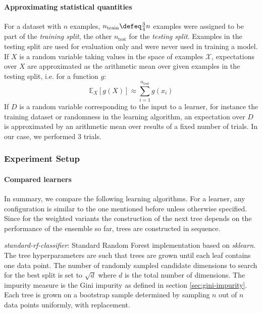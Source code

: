 \documentclass[
    a4paper, %
	fontsize=10pt, %
	twoside=false, %
]{kaobook}
\begin{document}
\paragraph{Approximating statistical quantities} 
For a dataset with $n$ examples, $n_{\text{train}} \defeq \frac{3}{4}n$ examples were assigned to be part of the \textit{training split}, the other $n_{\text{test}}$ for the \textit{testing split}. Examples in the testing split are used for evaluation only and were never used in training a model.
If $X$ is a random variable taking values in the space of examples $\mathcal{X}$, expectations over $X$ are approximated as the arithmetic mean over given examples in the testing split, i.e. for a function $g$:
$$
\mathbb{E}_X \left[ g(X) \right]  \approx \sum_{i=1}^{n_\text{test}} g(x_i)
$$
If $D$ is a random variable corresponding to the input to a learner, for instance the training dataset or randomness in the learning algorithm, an expectation over $D$ is approximated by an arithmetic mean over results of a fixed number of trials. In our case, we performed $3$ trials. %

\subsubsection{Experiment Setup}
\label{sec:experiment-setup}

\paragraph{Compared learners} In summary, we compare the following learning algorithms. For a learner, any configuration is similar to the one mentioned before unless otherwise specified. Since for the weighted variants the construction of the next tree depends on the performance of the ensemble so far, trees are constructed in sequence.

\textit{standard-rf-classifier}: Standard Random Forest implementation based on \textit{sklearn}. The tree hyperparameters are such that trees are grown until each leaf contains one data point. The number of randomly sampled candidate dimensions to search for the best split is set to $\sqrt{d}$ where $d$ is the total number of dimensions. The impurity measure is the Gini impurity as defined in section \ref{sec:gini-impurity}. Each tree is grown on a bootstrap sample determined by sampling $n$ out of $n$ data points uniformly, with replacement.
\end{document}
